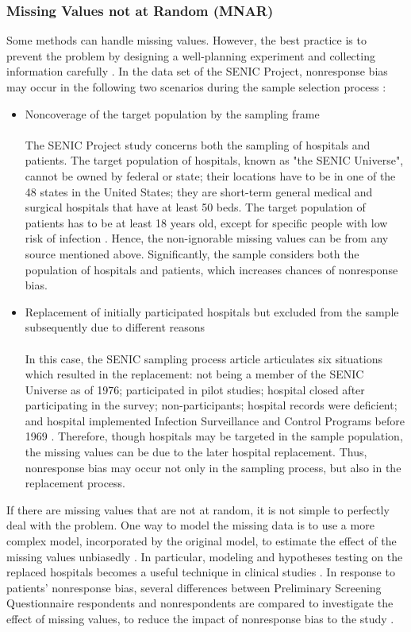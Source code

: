 \documentclass[11pt]{article}
\begin{document}
\subsubsection{Missing Values not at Random (MNAR)}\label{sec:2.2.2}
Some methods can handle missing values. However, the best practice is to prevent the problem by designing a well-planning experiment and collecting information carefully \cite{ar:desarbo_green_carroll, ar:w_l_o_t}. In the data set of the SENIC Project, nonresponse bias may occur in the following two scenarios during the sample selection process \cite{ar:senic2}:
\begin{itemize}
\item Noncoverage of the target population by the sampling frame\\\\
The SENIC Project study concerns both the sampling of hospitals and patients. The target population of hospitals, known as "the SENIC Universe", cannot be owned by federal or state; their locations have to be in one of the 48 states in the United States; they are short-term general medical and surgical hospitals that have at least 50 beds. The target population of patients has to be at least 18 years old, except for specific people with low risk of infection \cite{ar:senic2}. Hence, the non-ignorable missing values can be from any source mentioned above. Significantly, the sample considers both the population of hospitals and patients, which increases chances of nonresponse bias. 
\\
\item Replacement of initially participated hospitals but excluded from the sample subsequently due to different reasons\\\\
In this case, the SENIC sampling process article articulates six situations which resulted in the replacement: not being a member of the SENIC Universe as of 1976; participated in pilot studies; hospital closed after participating in the survey; non-participants; hospital records were deficient; and hospital implemented Infection Surveillance and Control Programs before 1969 \cite{ar:senic2}. Therefore, though hospitals may be targeted in the sample population, the missing values can be due to the later hospital replacement. Thus, nonresponse bias may occur not only in the sampling process, but also in the replacement process.\\
\end{itemize}

If there are missing values that are not at random, it is not simple to perfectly deal with the problem. One way to model the missing data is to use a more complex model, incorporated by the original model, to estimate the effect of the missing values unbiasedly \cite{ar:kang}. In particular, modeling and hypotheses testing on the replaced hospitals becomes a useful technique in clinical studies \cite{ar:senic2}. In response to patients' nonresponse bias, several differences between Preliminary Screening Questionnaire respondents and nonrespondents are compared to investigate the effect of missing values, to reduce the impact of nonresponse bias to the study \cite{ar:senic2}.




\end{document}
